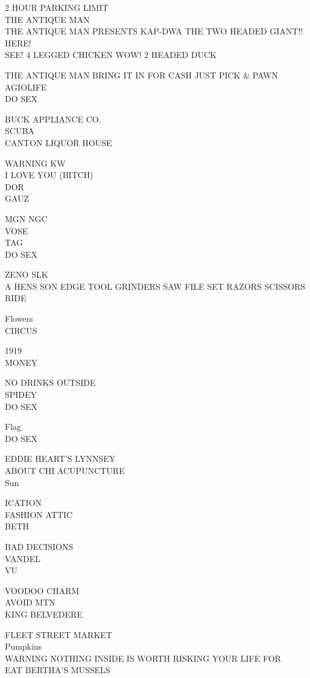 \documentclass[10pt,letterpaper]{article}
\begin{document}
2 HOUR PARKING LIMIT\\
THE ANTIQUE MAN\\
THE ANTIQUE MAN PRESENTS KAP{-}DWA THE TWO HEADED GIANT!! HERE!\\
SEE! 4 LEGGED CHICKEN WOW! 2 HEADED DUCK

THE ANTIQUE MAN BRING IT IN FOR CASH JUST PICK \& PAWN\\
AGIOLIFE\\
DO SEX

BUCK APPLIANCE CO.\\
SCUBA\\
CANTON LIQUOR HOUSE

WARNING KW\\
I LOVE YOU (BITCH)\\
DOR\\
GAUZ

MGN NGC\\
VOSE\\
TAG\\
DO SEX

ZENO SLK\\
A HENS SON EDGE TOOL GRINDERS SAW FILE SET RAZORS SCISSORS\\
RIDE

Flowers\\
CIRCUS

1919\\
MONEY

NO DRINKS OUTSIDE\\
SPIDEY\\
DO SEX

Flag\\
DO SEX

EDDIE HEART'S LYNNSEY\\
ABOUT CHI ACUPUNCTURE\\
Sun

ICATION\\
FASHION ATTIC\\
BETH

BAD DECISIONS\\
VANDEL\\
VU

VOODOO CHARM\\
AVOID MTN\\
KING BELVEDERE

FLEET STREET MARKET\\
Pumpkins\\
WARNING NOTHING INSIDE IS WORTH RISKING YOUR LIFE FOR\\
EAT BERTHA'S MUSSELS
\end{document}
